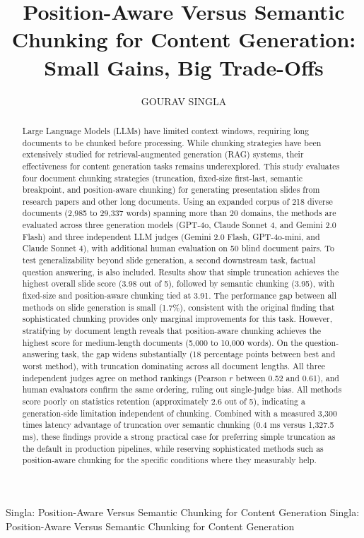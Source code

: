 \documentclass{ieeeaccess}
\begin{document}

\title{Position-Aware Versus Semantic Chunking for Content Generation: Small Gains, Big Trade-Offs}
\author{\uppercase{Gourav Singla}}
\address{Independent Researcher, Sugar Hill, GA, USA (e-mail: gouravsingla05@gmail.com)}

\markboth
{Singla: Position-Aware Versus Semantic Chunking for Content Generation}
{Singla: Position-Aware Versus Semantic Chunking for Content Generation}


\begin{abstract}
Large Language Models (LLMs) have limited context windows, requiring long documents to be chunked before processing. While chunking strategies have been extensively studied for retrieval-augmented generation (RAG) systems, their effectiveness for content generation tasks remains underexplored. This study evaluates four document chunking strategies (truncation, fixed-size first-last, semantic breakpoint, and position-aware chunking) for generating presentation slides from research papers and other long documents. Using an expanded corpus of 218 diverse documents (2,985 to 29,337 words) spanning more than 20 domains, the methods are evaluated across three generation models (GPT-4o, Claude Sonnet 4, and Gemini 2.0 Flash) and three independent LLM judges (Gemini 2.0 Flash, GPT-4o-mini, and Claude Sonnet 4), with additional human evaluation on 50 blind document pairs. To test generalizability beyond slide generation, a second downstream task, factual question answering, is also included. Results show that simple truncation achieves the highest overall slide score (3.98 out of 5), followed by semantic chunking (3.95), with fixed-size and position-aware chunking tied at 3.91. The performance gap between all methods on slide generation is small (1.7\%), consistent with the original finding that sophisticated chunking provides only marginal improvements for this task. However, stratifying by document length reveals that position-aware chunking achieves the highest score for medium-length documents (5,000 to 10,000 words). On the question-answering task, the gap widens substantially (18 percentage points between best and worst method), with truncation dominating across all document lengths. All three independent judges agree on method rankings (Pearson $r$ between 0.52 and 0.61), and human evaluators confirm the same ordering, ruling out single-judge bias. All methods score poorly on statistics retention (approximately 2.6 out of 5), indicating a generation-side limitation independent of chunking. Combined with a measured 3,300 times latency advantage of truncation over semantic chunking (0.4 ms versus 1,327.5 ms), these findings provide a strong practical case for preferring simple truncation as the default in production pipelines, while reserving sophisticated methods such as position-aware chunking for the specific conditions where they measurably help.
\end{abstract}
\end{document}
